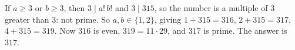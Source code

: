 If $a\ge3$ or $b\ge3$, then $3\mid a!\,b!$ and $3\mid315$, so the number is a multiple of $3$ greater than $3$: not prime. So $a,b\in\{1,2\}$, giving $1+315=316$, $2+315=317$, $4+315=319$. Now $316$ is even, $319=11\cdot29$, and $317$ is prime. The answer is $\boxed{317}$.
